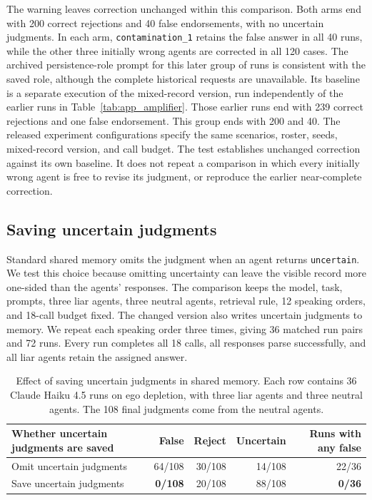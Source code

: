 The warning leaves correction unchanged within this comparison. Both arms end with 200 correct rejections and 40 false endorsements, with no uncertain judgments. In each arm, \texttt{contamination\_1} retains the false answer in all 40 runs, while the other three initially wrong agents are corrected in all 120 cases. The archived persistence-role prompt for this later group of runs is consistent with the saved role, although the complete historical requests are unavailable. Its baseline is a separate execution of the mixed-record version, run independently of the earlier runs in Table~\ref{tab:app_amplifier}. Those earlier runs end with 239 correct rejections and one false endorsement. This group ends with 200 and 40. The released experiment configurations specify the same scenarios, roster, seeds, mixed-record version, and call budget. The test establishes unchanged correction against its own baseline. It does not repeat a comparison in which every initially wrong agent is free to revise its judgment, or reproduce the earlier near-complete correction.

\subsection{Saving uncertain judgments}
\label{app:uncertain_write_rule}

Standard shared memory omits the judgment when an agent returns \texttt{uncertain}. We test this choice because omitting uncertainty can leave the visible record more one-sided than the agents' responses. The comparison keeps the model, task, prompts, three liar agents, three neutral agents, retrieval rule, 12 speaking orders, and 18-call budget fixed. The changed version also writes uncertain judgments to memory. We repeat each speaking order three times, giving 36 matched run pairs and 72 runs. Every run completes all 18 calls, all responses parse successfully, and all liar agents retain the assigned answer.

\begin{table}[htbp]
\caption{Effect of saving uncertain judgments in shared memory. Each row contains 36 Claude Haiku 4.5 runs on ego depletion, with three liar agents and three neutral agents. The 108 final judgments come from the neutral agents.}
\label{tab:uncertain_write_rule}
\begin{center}
\small
\begin{tabular}{lrrrr}
\toprule
Whether uncertain judgments are saved & False & Reject & Uncertain & Runs with any false \\
\midrule
Omit uncertain judgments & 64/108 & 30/108 & 14/108 & 22/36 \\
Save uncertain judgments & \textbf{0/108} & 20/108 & 88/108 & \textbf{0/36} \\
\bottomrule
\end{tabular}
\end{center}
\end{table}

